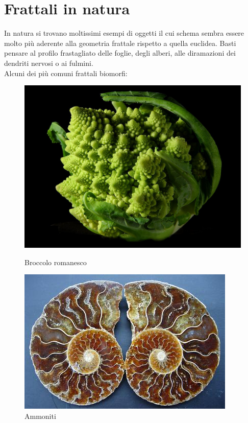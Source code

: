 \documentclass[10pt]{report}
\begin{document}
		\section{Frattali in natura}
			In natura si trovano moltissimi esempi di oggetti il cui schema sembra essere molto più aderente alla geometria frattale rispetto a quella euclidea. Basti pensare al profilo frastagliato delle foglie, degli alberi, alle diramazioni dei dendriti nervosi o ai fulmini.\\
			Alcuni dei più comuni frattali biomorfi:\\
			\begin{figure}[H]
				\centering
				\includegraphics[width=0.7\linewidth]{"Frattali in natura/Fractal_Broccoli"}
				\caption*{Broccolo romanesco}
				\label{fig:broccolo}
				\endminipage \hfill
				\centering
				\includegraphics[width=0.7\linewidth]{"Frattali in natura/ammoniti"}
				\caption*{Ammoniti}
				\label{fig:ammoniti}
				\endminipage \hfill
			\end{figure}
\end{document}
